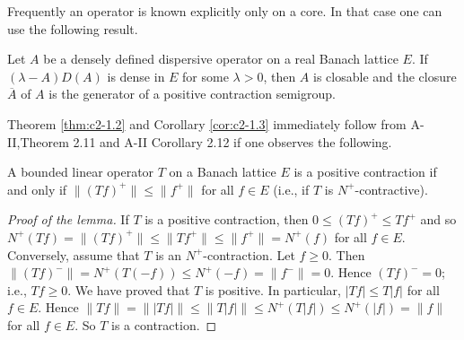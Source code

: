 Frequently an operator is known explicitly only on a core. In that case one can use the following result.

\begin{corollary}\label{cor:c2-1.3}
Let $A$ be a densely defined dispersive operator on a real Banach lattice $E$. 
If $(\lambda - A)D(A)$ is dense in $E$ for some $\lambda > 0$, then $A$ is closable and the closure $\overline{A}$ of $A$ is the generator of a positive contraction semigroup.
\end{corollary}

Theorem \ref{thm:c2-1.2}  and Corollary \ref{cor:c2-1.3}  immediately follow from A-II,Theorem 2.11 
and A-II Corollary 2.12 
if one observes the following.

\begin{lemma}\label{lem:c2-1.4}
A bounded linear operator $T$ on a Banach lattice $E$ is a positive contraction if and only if $\|(Tf)^{+}\| \leq \|f^{+}\|$ for all $f \in E$ (i.e., if $T$ is $N^{+}$-contractive).
\end{lemma}

\begin{proof}[Proof of the lemma]
If $T$ is a positive contraction, then $0 \leq (Tf)^{+} \leq Tf^{+}$ and so 
$N^{+}(Tf) = \|(Tf)^{+}\| \leq \|Tf^{+}\| \leq \|f^{+}\| = N^{+}(f)$ for all $f \in E$. 
Conversely, assume that $T$ is an $N^{+}$-contraction. 
Let $f \geq 0$. 
Then $\|(Tf)^{-}\| = N^{+}(T(-f)) \leq N^{+}(-f) = \|f^{-}\| = 0$. 
Hence $(Tf)^{-} = 0$; i.e., $Tf \geq 0$. 
We have proved that $T$ is positive. 
In particular, $|Tf| \leq T|f|$ for all $f \in E$. 
Hence $\|Tf\| = \||Tf|\| \leq \|T|f|\| \leq N^{+}(T|f|) \leq N^{+}(|f|) = \|f\|$ for all $f \in E$. 
So $T$ is a contraction.
\end{proof}

